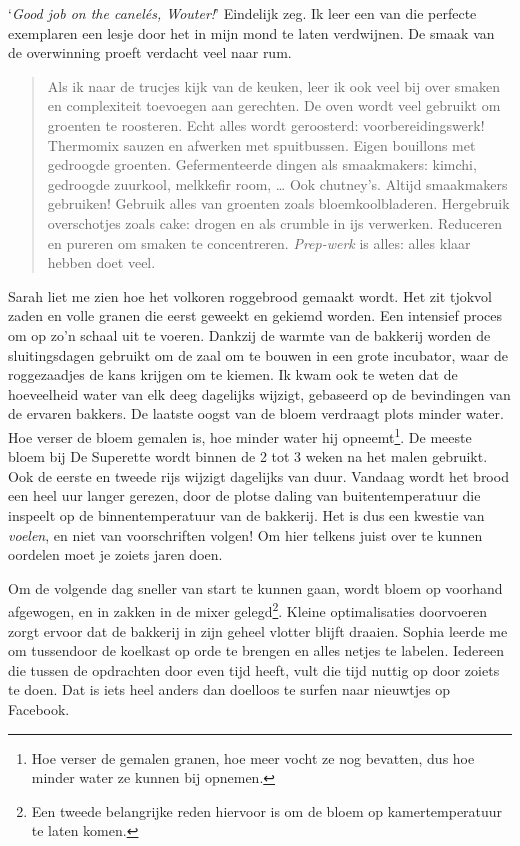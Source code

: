 \documentclass[
  11pt,
  dutch,
]{memoir}
\begin{document}
`\emph{Good job on the canelés, Wouter!}' Eindelijk zeg. Ik leer een van
die perfecte exemplaren een lesje door het in mijn mond te laten
verdwijnen. De smaak van de overwinning proeft verdacht veel naar rum.

\begin{quote}
Als ik naar de trucjes kijk van de keuken, leer ik ook veel bij over
smaken en complexiteit toevoegen aan gerechten. De oven wordt veel
gebruikt om groenten te roosteren. Echt alles wordt geroosterd:
voorbereidingswerk! Thermomix sauzen en afwerken met spuitbussen. Eigen
bouillons met gedroogde groenten. Gefermenteerde dingen als smaakmakers:
kimchi, gedroogde zuurkool, melkkefir room, \ldots{} Ook chutney's.
Altijd smaakmakers gebruiken! Gebruik alles van groenten zoals
bloemkoolbladeren. Hergebruik overschotjes zoals cake: drogen en als
crumble in ijs verwerken. Reduceren en pureren om smaken te
concentreren. \emph{Prep-werk} is alles: alles klaar hebben doet veel.
\end{quote}

Sarah liet me zien hoe het volkoren roggebrood gemaakt wordt. Het zit
tjokvol zaden en volle granen die eerst geweekt en gekiemd worden. Een
intensief proces om op zo'n schaal uit te voeren. Dankzij de warmte van
de bakkerij worden de sluitingsdagen gebruikt om de zaal om te bouwen in
een grote incubator, waar de roggezaadjes de kans krijgen om te kiemen.
Ik kwam ook te weten dat de hoeveelheid water van elk deeg dagelijks
wijzigt, gebaseerd op de bevindingen van de ervaren bakkers. De laatste
oogst van de bloem verdraagt plots minder water. Hoe verser de bloem
gemalen is, hoe minder water hij opneemt\footnote{Hoe verser de gemalen
  granen, hoe meer vocht ze nog bevatten, dus hoe minder water ze kunnen
  bij opnemen.}. De meeste bloem bij De Superette wordt binnen de 2 tot
3 weken na het malen gebruikt. Ook de eerste en tweede rijs wijzigt
dagelijks van duur. Vandaag wordt het brood een heel uur langer gerezen,
door de plotse daling van buitentemperatuur die inspeelt op de
binnentemperatuur van de bakkerij. Het is dus een kwestie van
\emph{voelen}, en niet van voorschriften volgen! Om hier telkens juist
over te kunnen oordelen moet je zoiets jaren doen.

Om de volgende dag sneller van start te kunnen gaan, wordt bloem op
voorhand afgewogen, en in zakken in de mixer gelegd\footnote{Een tweede
  belangrijke reden hiervoor is om de bloem op kamertemperatuur te laten
  komen.}. Kleine optimalisaties doorvoeren zorgt ervoor dat de bakkerij
in zijn geheel vlotter blijft draaien. Sophia leerde me om tussendoor de
koelkast op orde te brengen en alles netjes te labelen. Iedereen die
tussen de opdrachten door even tijd heeft, vult die tijd nuttig op door
zoiets te doen. Dat is iets heel anders dan doelloos te surfen naar
nieuwtjes op Facebook.
\end{document}
